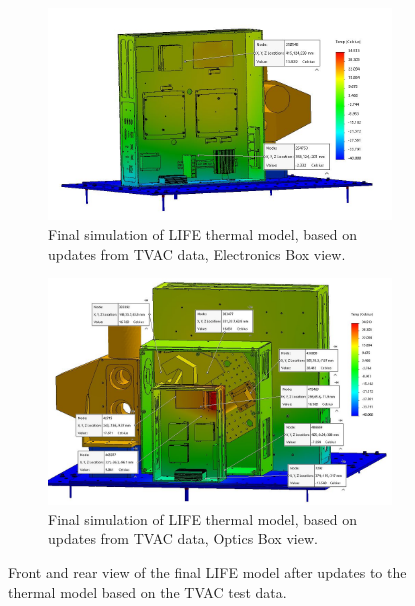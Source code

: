 \begin{figure}
    \centering
    \begin{subfigure}[h]{0.9\textwidth}
        \centering
        \includegraphics[width=\textwidth]{chap3_images/LIFE_FINAL_SIMS/Test_22_Ebox_Labels.JPG}
        \caption{Final simulation of LIFE thermal model, based on updates from TVAC data, Electronics Box view.}
        \label{fig:LIFE_V5_FINAL_TVAC_TA_EBOX}
    \end{subfigure}
    \begin{subfigure}[h]{0.9\textwidth}
        \centering
        \includegraphics[width=\textwidth]{chap3_images/LIFE_FINAL_SIMS/Test_22_BBEbox_Labels.JPG}
        \caption{Final simulation of LIFE thermal model, based on updates from TVAC data, Optics Box view.}
        \label{fig:LIFE_V5_FINAL_TVAC_TA_OBOX}
    \end{subfigure}
    \caption{Front and rear view of the final LIFE model after updates to the thermal model based on the TVAC test data.}
    \label{LIFE_V5_FINAL_TVAC_TA}
\end{figure}


